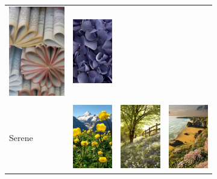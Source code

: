 \begin{figure}
\begin{subfigure}[t]{0.48\linewidth}
\begin{tabular}{m{.05in}|m{\dgap} m{\dgap} m{\dgap}}
    \includegraphics[width=.8in]{../style/figures/flickr_on_pinterest/flower/pred_style_Geometric_Composition/h/1.jpg} &
    \includegraphics[width=.8in]{../style/figures/flickr_on_pinterest/flower/pred_style_Geometric_Composition/h/4.jpg} \\ \\
    \begin{turn}{90}\small{Serene}\end{turn} &
    \includegraphics[width=.8in]{../style/figures/flickr_on_pinterest/flower/pred_style_Serene/h/0.jpg} &
    \includegraphics[width=.8in]{../style/figures/flickr_on_pinterest/flower/pred_style_Serene/h/2.jpg} &
    \includegraphics[width=.8in]{../style/figures/flickr_on_pinterest/flower/pred_style_Serene/h/3.jpg} \\

\end{tabular}
\end{subfigure}
\end{figure}
